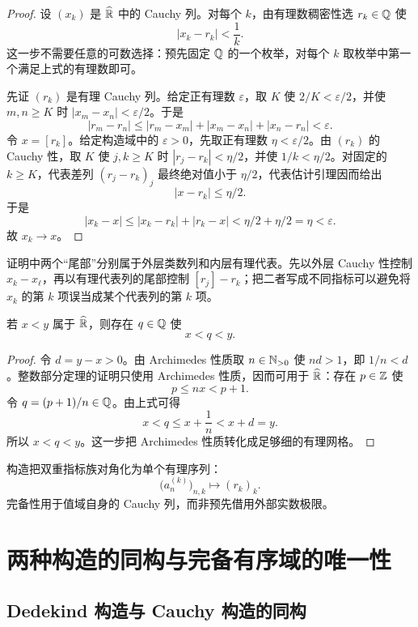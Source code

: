 \begin{proof}
设 \((x_k)\) 是 \(\widehat{\mathbb{R}}\) 中的 Cauchy 列。对每个 \(k\)，由有理数稠密性选 \(r_k\in\mathbb{Q}\) 使
\[
 |x_k-r_k|<\frac1k.
\]
这一步不需要任意的可数选择：预先固定 \(\mathbb{Q}\) 的一个枚举，对每个 \(k\) 取枚举中第一个满足上式的有理数即可。

先证 \((r_k)\) 是有理 Cauchy 列。给定正有理数 \(\varepsilon\)，取 \(K\) 使 \(2/K<\varepsilon/2\)，并使 \(m,n\ge K\) 时 \(|x_m-x_n|<\varepsilon/2\)。于是
\[
 |r_m-r_n|\le|r_m-x_m|+|x_m-x_n|+|x_n-r_n|<\varepsilon.
\]
令 \(x=[r_k]\)。给定构造域中的 \(\varepsilon>0\)，先取正有理数 \(\eta<\varepsilon/2\)。由 \((r_k)\) 的 Cauchy 性，取 \(K\) 使 \(j,k\ge K\) 时 \(|r_j-r_k|<\eta/2\)，并使 \(1/k<\eta/2\)。对固定的 \(k\ge K\)，代表差列 \((r_j-r_k)_j\) 最终绝对值小于 \(\eta/2\)，代表估计引理因而给出
\[
  |x-r_k|\le\eta/2.
\]
于是
\[
 |x_k-x|\le |x_k-r_k|+|r_k-x|
 <\eta/2+\eta/2=\eta<\varepsilon.
\]
故 \(x_k\to x\)。
\end{proof}

证明中两个“尾部”分别属于外层类数列和内层有理代表。先以外层 Cauchy 性控制 \(x_k-x_\ell\)，再以有理代表列的尾部控制 \([r_j]-r_k\)；把二者写成不同指标可以避免将 \(x_k\) 的第 \(k\) 项误当成某个代表列的第 \(k\) 项。

\begin{proposition}[构造域中有理数的稠密性]
若 \(x<y\) 属于 \(\widehat{\mathbb{R}}\)，则存在 \(q\in\mathbb{Q}\) 使
\[
 x<q<y.
\]
\end{proposition}

\begin{proof}
令 \(d=y-x>0\)。由 Archimedes 性质取 \(n\in\mathbb{N}_{>0}\) 使 \(nd>1\)，即 \(1/n<d\)。整数部分定理的证明只使用 Archimedes 性质，因而可用于 \(\widehat{\mathbb{R}}\)：存在 \(p\in\mathbb{Z}\) 使
\[
 p\le nx<p+1.
\]
令 \(q=(p+1)/n\in\mathbb{Q}\)。由上式可得
\[
 x<q\le x+\frac1n< x+d=y.
\]
所以 \(x<q<y\)。这一步把 Archimedes 性质转化成足够细的有理网格。
\end{proof}

构造把双重指标族对角化为单个有理序列：
\[
 \bigl(a_n^{(k)}\bigr)_{n,k}\longmapsto(r_k)_k.
\]
完备性用于值域自身的 Cauchy 列，而非预先借用外部实数极限。

\section{两种构造的同构与完备有序域的唯一性}

\subsection{Dedekind 构造与 Cauchy 构造的同构}

